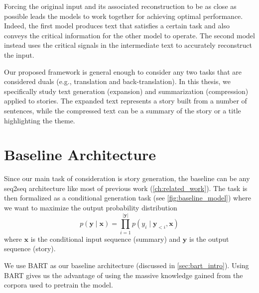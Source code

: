 Forcing the original input and its associated reconstruction to be as close as possible leads the models to work together for achieving optimal performance. Indeed, the first model produces text that satisfies a certain task and also conveys the critical information for the other model to operate. The second model instead uses the critical signals in the intermediate text to accurately reconstruct the input. 

Our proposed framework is general enough to consider any two tasks that are considered duals (e.g., translation and back-translation). In this thesis, we specifically study text generation (expansion) and summarization (compression) applied to stories. The expanded text represents a story built from a number of sentences, while the compressed text can be a summary of the story or a title highlighting the theme.



\section{Baseline Architecture}
\label{sec:baseline_arch}


Since our main task of consideration is story generation, the baseline can be any seq2seq architecture like most of previous work (\cref{ch:related_work}). The task is then formalized as a conditional generation task (see \cref{fig:baseline_model}) where we want to maximize the output probability distribution
\[ p(\mathbf{y} \mid \mathbf{x}) = \prod_{i=1}^{|\mathbf{y}|} p(y_i \mid \mathbf{y}_{<i}, \mathbf{x})  \]
where $\mathbf{x}$ is the conditional input sequence (summary) and $\mathbf{y}$ is the output sequence (story).

We use BART \citep{lewis2019bart} as our baseline architecture (discussed in \cref{sec:bart_intro}). Using BART gives us the advantage of using the massive knowledge gained from the corpora used to pretrain the model.

